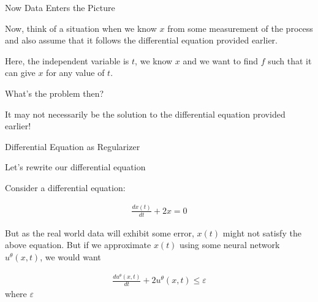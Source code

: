 \documentclass[aspectratio=169,xcolor=dvipsnames,svgnames,x11names,fleqn]{beamer}
\begin{document}
\begin{frame}{Now Data Enters the Picture}

\begin{center}
\color{crimson}
Now, think of a situation when we know $x$ from some measurement of the process and also assume that it follows the differential equation provided earlier.
\end{center}

\pause

\vspace{10pt}

Here, the independent variable is $t$, we know $x$ and we want to find $f$ such that it can give $x$ for any value of $t$.

\pause

\begin{center}
\color{DarkGreen}
\Large
What's the problem then?

\pause 

\vspace{5pt}

\color{DarkRed}
\large 

It may not necessarily be the solution to the differential equation provided earlier!

\end{center}


\end{frame}


\begin{frame}{Differential Equation as Regularizer}

Let's rewrite our differential equation

\begin{tcolorbox}[    enhanced,
    colback=springBlossom,
    colframe=borderLine,
    arc=0pt, 
    boxrule=0.3pt,
    leftrule=3pt,
    borderline west={5pt}{0pt}{accentOrange}, 
    fontupper=\color{boxBackground},
    pad at break*=0mm,
    top=5pt, bottom=5pt, left=5pt, right=5pt]
    
   Consider a differential equation:
   
   \begin{align*}
   \frac{dx(t)}{dt}  + 2x = 0
   \end{align*}

\end{tcolorbox}

But as the real world data will exhibit some error, $x(t)$ might not satisfy the above equation. But if we approximate $x(t)$ using some neural network $u^\theta(x, t)$, we would want

\begin{align*}
\frac{d u^\theta(x, t)}{dt}  + 2 u^\theta(x, t) \leq \varepsilon
\end{align*}
where $\varepsilon$

\end{frame}
\end{document}
